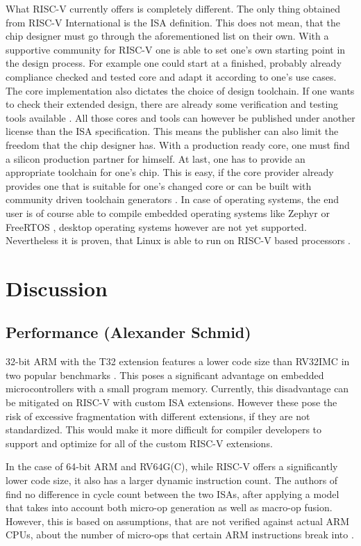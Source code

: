 \documentclass[conference]{IEEEtran}
\begin{document}
	What RISC-V currently offers is completely different. The only thing obtained from RISC-V International is the \gls{ISA} definition. This does not mean, that the chip designer must go through the aforementioned list on their own. With a supportive community for RISC-V one is able to set one's own starting point in the design process. For example one could start at a finished, probably already compliance checked and tested core \cite{RVCores} and adapt it according to one's use cases. The core implementation also dictates the choice of design toolchain. If one wants to check their extended design, there are already some verification and testing tools available \cite{Bartley2020}. All those cores and tools can however be published under another license than the \gls{ISA} specification. This means the publisher can also limit the freedom that the chip designer has. With a production ready core, one must find a silicon production partner for himself.
	At last, one has to provide an appropriate toolchain for one's chip. This is easy, if the core provider already provides one \cite{SiFive} that is suitable for one's changed core or can be built with community driven toolchain generators \cite{NG}.
	In case of operating systems, the end user is of course able to compile embedded operating systems like Zephyr \cite{LinuxFoundation} or FreeRTOS \cite{Aws2020}, desktop operating systems however are not yet supported. Nevertheless it is proven, that Linux is able to run on RISC-V based processors \cite{SiFivea}.

\section{Discussion}
\label{ref:discussion}

	\subsection{Performance (Alexander Schmid)}
	32-bit ARM with the T32 extension features a lower code size than RV32IMC in two popular benchmarks \cite{Perotti2020}.
	This poses a significant advantage on embedded microcontrollers with a small program memory.
	Currently, this disadvantage can be mitigated on RISC-V with custom ISA extensions.
	However these
	pose the risk of excessive fragmentation with different extensions, if they are not standardized.
	This would make it more difficult for compiler developers to support and optimize for all of the custom
	RISC-V extensions.

	In the case of 64-bit ARM and RV64G(C), while RISC-V offers a significantly lower code size, it also has a larger
	dynamic instruction count. The authors of \cite{Celio2016} find no difference in cycle count
	between the two \glspl{ISA}, after applying a model that takes into account both micro-op generation as well as macro-op fusion.
	However, this is based on assumptions, that are not verified against actual ARM \glspl{CPU}, about the number of micro-ops that
	certain ARM instructions break into \cite[slide 40]{Celio2016}.
\end{document}
